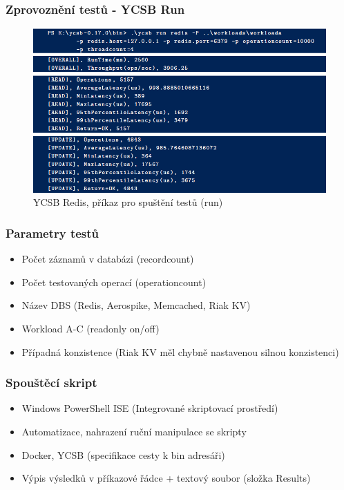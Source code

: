 \documentclass{beamer}
\begin{document}
	\begin{frame}
		\frametitle{Zprovoznění testů - YCSB Run}
		\begin{figure}
			\centering
			\includegraphics[scale=0.53]{Figures/ycsb_run_cut.PNG}
			\caption{YCSB Redis, příkaz pro spuštění testů (run)}
		\end{figure}
	\end{frame}
	
	\begin{frame}
		\frametitle{Parametry testů}
		\begin{itemize}
			\item Počet záznamů v databázi (recordcount)
			\item Počet testovaných operací (operationcount)
			\item Název DBS (Redis, Aerospike, Memcached, Riak KV)
			\item Workload A-C (readonly on/off)
			\item Případná konzistence (Riak KV měl chybně nastavenou silnou konzistenci)
		\end{itemize}
	\end{frame}
	
	\begin{frame}
		\frametitle{Spouštěcí skript}
		\begin{itemize}
			\item Windows PowerShell ISE (Integrované skriptovací prostředí)
			\item Automatizace, nahrazení ruční manipulace se skripty
			\item Docker, YCSB (specifikace cesty k bin adresáři)
			\item Výpis výsledků v příkazové řádce + textový soubor (složka Results)
		\end{itemize}
	\end{frame}
	
\end{document}
